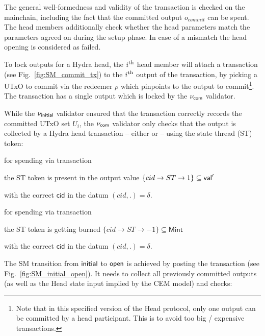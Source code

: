 The general well-formedness and validity of the \mtxInit{} transaction is
checked on the mainchain, including the fact that the committed output
$o_{commit}$ can be spent. The head members additionally check whether the head
parameters match the parameters agreed on during the setup phase. In case of a
mismatch the head opening is considered as failed.

 To lock outputs for a Hydra head, the
$i^{\text{th}}$ head member will attach a \mtxCom{} transaction (see
Fig.~\ref{fig:SM_commit_tx}) to the $i^{\text{th}}$ output of the \mtxInit{}
transaction, by picking a UTxO to commit via the redeemer $\rho$ which pinpoints
to the output to commit\footnote{Note that in this specified version of the Head
  protocol, only one output can be committed by a head participant. This is to
  avoid too big / expensive \mtxCollect{} transactions.}. The \mtxCom{}
transaction has a single output which is locked by the $\nu_\mathsf{com}$ validator.

While the $\nu_\mathsf{initial}$ validator ensured that the \mtxCommit{} transaction
correctly records the committed UTxO set $U_i$, the $\nu_\mathsf{com}$ validator only
checks that the output is collected by a Hydra head transaction -- either
\mtxCCom{} or \mtxAbort{} -- using the state thread (ST) token:

\begin{menumerate}
  \item for spending via \mtxCom{} transaction
    \begin{menumerate}
      \item the ST token is present in the output value $\{cid \rightarrow ST \rightarrow 1\} \subseteq \mathsf{val}'$
      \item with the correct $\mathsf{cid}$ in the datum $(cid,.) = \delta$.
    \end{menumerate}
  \item for spending via \mtxAbort{} transaction
    \begin{menumerate}
      \item the ST token is getting burned $\{cid \rightarrow ST \rightarrow -1\} \subseteq \mathsf{Mint}$
      \item with the correct $\mathsf{cid}$ in the datum $(cid,.) = \delta$.
    \end{menumerate}
\end{menumerate}



 The SM transition from $\mathsf{initial}$ to
$\mathsf{open}$ is achieved by posting the \mtxCCom{} transaction (see
Fig.~\ref{fig:SM_initial_open}). It needs to collect all previously committed
outputs (as well as the Head state input implied by the CEM model) and checks:

